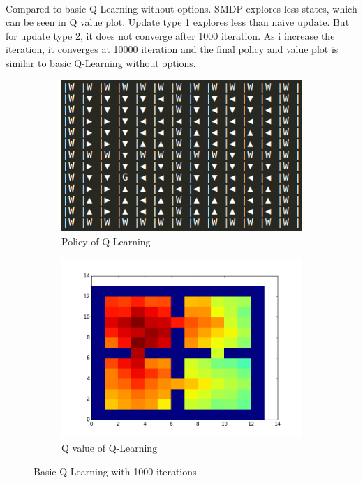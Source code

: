 \documentclass[]{article}
\begin{document}
\paragraph{}Compared to basic Q-Learning without options. SMDP explores less states, which can be seen in Q value plot. Update type 1 explores less than naive update. But for update type 2, it does not converge after 1000 iteration. As i increase the iteration, it converges at 10000 iteration and the final policy and value plot is similar to basic Q-Learning without options.
\begin{figure}
	\centering
	\begin{subfigure}[b]{0.475\textwidth}
	\includegraphics[width=\linewidth]{basic_q.png}
	\caption{Policy of Q-Learning}
	\end{subfigure}
	\begin{subfigure}[b]{0.475\textwidth}
		\centering
		\includegraphics[width=.9\linewidth]{basic_q_value_plot.png}
		\caption{Q value of Q-Learning}
	\end{subfigure}
	\caption{Basic Q-Learning with 1000 iterations}
\end{figure}
\end{document}
